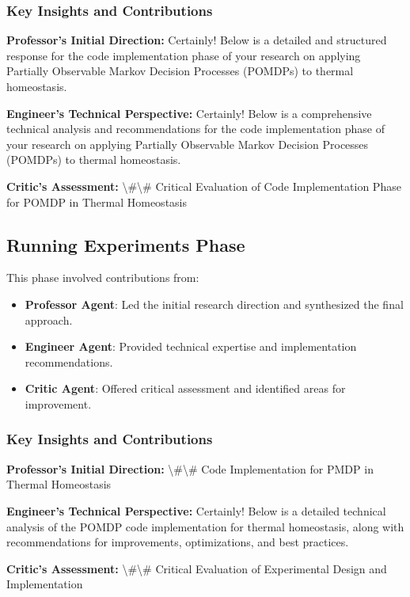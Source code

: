 \documentclass[11pt,a4paper]{article}
\begin{document}
\subsubsection{Key Insights and Contributions}


\textbf{Professor's Initial Direction:} Certainly! Below is a detailed and structured response for the code implementation phase of your research on applying Partially Observable Markov Decision Processes (POMDPs) to thermal homeostasis.


\textbf{Engineer's Technical Perspective:} Certainly! Below is a comprehensive technical analysis and recommendations for the code implementation phase of your research on applying Partially Observable Markov Decision Processes (POMDPs) to thermal homeostasis.


\textbf{Critic's Assessment:} \textbackslash{}#\textbackslash{}# Critical Evaluation of Code Implementation Phase for POMDP in Thermal Homeostasis


\subsection{Running Experiments Phase}


This phase involved contributions from:

\begin{itemize}
\item \textbf{Professor Agent}: Led the initial research direction and synthesized the final approach.
\item \textbf{Engineer Agent}: Provided technical expertise and implementation recommendations.
\item \textbf{Critic Agent}: Offered critical assessment and identified areas for improvement.
\end{itemize}

\subsubsection{Key Insights and Contributions}


\textbf{Professor's Initial Direction:} \textbackslash{}#\textbackslash{}# Code Implementation for PMDP in Thermal Homeostasis


\textbf{Engineer's Technical Perspective:} Certainly! Below is a detailed technical analysis of the POMDP code implementation for thermal homeostasis, along with recommendations for improvements, optimizations, and best practices.


\textbf{Critic's Assessment:} \textbackslash{}#\textbackslash{}# Critical Evaluation of Experimental Design and Implementation
\end{document}
